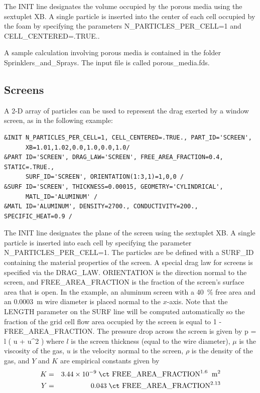 \documentclass[11pt]{book}
\begin{document}
The {\ct INIT} line designates the volume occupied by the porous media using the sextuplet {\ct XB}. A single particle is inserted into the center of each cell occupied by the foam by specifying the parameters {\ct N\_PARTICLES\_PER\_CELL=1} and {\ct CELL\_CENTERED=.TRUE.}.

A sample calculation involving porous media is contained in the folder {\ct Sprinklers\_and\_Sprays}. The input file is called {\ct porous\_media.fds}.

\subsection{Screens}
\label{info:particle_screen}

A 2-D array of particles can be used to represent the drag exerted by a window screen, as in the following example:
\begin{lstlisting}
&INIT N_PARTICLES_PER_CELL=1, CELL_CENTERED=.TRUE., PART_ID='SCREEN',
      XB=1.01,1.02,0.0,1.0,0.0,1.0/
&PART ID='SCREEN', DRAG_LAW='SCREEN', FREE_AREA_FRACTION=0.4, STATIC=.TRUE.,
      SURF_ID='SCREEN', ORIENTATION(1:3,1)=1,0,0 /
&SURF ID='SCREEN', THICKNESS=0.00015, GEOMETRY='CYLINDRICAL',
      MATL_ID='ALUMINUM' /
&MATL ID='ALUMINUM', DENSITY=2700., CONDUCTIVITY=200., SPECIFIC_HEAT=0.9 /
\end{lstlisting}
The {\ct INIT} line designates the plane of the screen using the sextuplet {\ct XB}. A single particle is inserted into each cell by specifying the parameter {\ct N\_PARTICLES\_PER\_CELL=1}.  The particles are be defined with a {\ct SURF\_ID} containing the material properties of the screen.  A special drag law for screens is specified via the {\ct DRAG\_LAW}.  {\ct ORIENTATION} is the direction normal to the screen, and {\ct FREE\_AREA\_FRACTION} is the fraction of the screen's surface area that is open. In the example, an aluminum screen with a 40~\% free area and an 0.0003~m wire diameter is placed normal to the $x$-axis.  Note that the {\ct LENGTH} parameter on the {\ct SURF} line will be computed automatically so the fraction of the grid cell flow area occupied by the screen is equal to 1 - {\ct FREE\_AREA\_FRACTION}. The pressure drop across the screen is given by
\be
   \label{eqn_screen}
   \Delta p =  l \; \left( u + \rho {} u^2 \right)
\ee
where $l$ is the screen thickness (equal to the wire diameter), $\mu$ is the viscosity of the gas, $u$ is the velocity normal to the screen, $\rho$ is the density of the gas, and $Y$ and $K$ are empirical constants given by
\begin{eqnarray}
   K &=& 3.44 \times 10^{-9} \; \hbox{\ct FREE\_AREA\_FRACTION}^{1.6} \; \; \hbox{m}^2 \\
   Y &=& 0.043 \; \hbox{\ct FREE\_AREA\_FRACTION}^{2.13}
\end{eqnarray}
\end{document}
